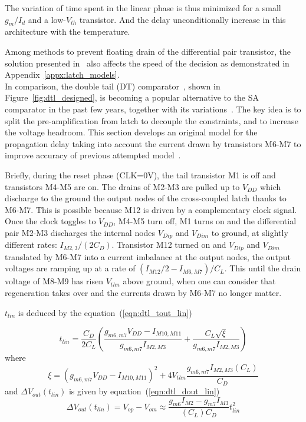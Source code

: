 The variation of time spent in the linear phase is thus minimized for a small \(g_m/I_d\) and a low-\(V_{th}\) transistor. And the delay unconditionally increase in this architecture with the temperature.

Among methods to prevent floating drain of the differential pair transistor, the solution presented in~\cite{Montanaro1996} also affects the speed of the decision as demonstrated in Appendix~\ref{appx:latch_models}.\\

In comparison, the double tail (DT) comparator~\cite{Schinkel2007}, shown in Figure~\ref{fig:dtl_designed}, is becoming a popular alternative to the SA comparator in the past few years, together with its variations~\cite{Miyahara2008,Babayan2014,Khorami2016}. The key idea is to split the pre-amplification from latch to decouple the constraints, and to increase the voltage headroom. This section develops an original model for the propagation delay taking into account the current drawn by transistors M6-M7 to improve accuracy of previous attempted model~\cite{Babayan2014}.

Briefly, during the reset phase (CLK=0V), the tail transistor M1 is off and transistors M4-M5 are on. The drains of M2-M3 are pulled up to \(V_{DD}\) which discharge to the ground the output nodes of the cross-coupled latch thanks to M6-M7. This is possible because M12 is driven by a complementary clock signal.
Once the clock toggles to \(V_{DD}\), M4-M5 turn off, M1 turns on and the differential pair M2-M3 discharges the internal nodes \(V_{Dip}\) and \(V_{Dim}\) to ground, at slightly different rates: \(I_{M2,3}/(2C_{D})\). Transistor M12 turned on and \(V_{Dip}\) and \(V_{Dim}\) translated by M6-M7 into a current imbalance at the output nodes, the output voltages are ramping up at a rate of \((I_{M12}/2-I_{M6,M7})/C_{L}\). This until the drain voltage of M8-M9 has risen \(V_{thn}\) above ground, when one can consider that regeneration takes over and the currents drawn by M6-M7 no longer matter. 

\(t_{lin}\) is deduced by the equation~(\ref{eqn:dtl_tout_lin})

\begin{equation}
\label{eqn:dtl_tout_lin}
t_{lin} = \frac{C_D}{2C_L} \left(\frac{g_{m6,m7}V_{DD}-I_{M10,M11}}{g_{m6,m7}I_{M2,M3}} + \frac{C_L\sqrt{\xi}}{g_{m6,m7}I_{M2,M3}} \right)
\end{equation}
where 
\begin{equation}
\xi = {\left(g_{m6,m7}V_{DD}-I_{M10,M11}\right)}^2  + 4V_{thn}\frac{g_{m6,m7}I_{M2,M3}(C_{L})}{C_D}
\end{equation}
and \(\Delta V_{out}(t_{lin})\) is given by equation~(\ref{eqn:dtl_dout_lin})
\begin{equation}
\label{eqn:dtl_dout_lin}
\Delta V_{out}(t_{lin}) = V_{op}-V_{om} \approx \frac{g_{m6}I_{M2}-g_{m7}I_{M3}}{(C_{L})C_D}t_{lin}^2
\end{equation}


